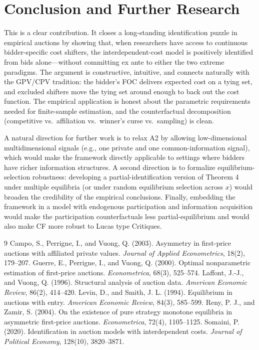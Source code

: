 \documentclass{article}
\begin{document}
\section{Conclusion and Further Research}
\label{section4}
This is a clear contribution. It closes a long-standing identification puzzle in empirical auctions by showing that, when researchers have access to continuous bidder-specific cost shifters, the interdependent-cost model is positively identified from bids alone---without committing ex ante to either the two extreme paradigms. The argument is constructive, intuitive, and connects naturally with the GPV/CPV tradition: the bidder's FOC delivers expected cost on a tying set, and excluded shifters move the tying set around enough to back out the cost function. The empirical application is honest about the parametric requirements needed for finite-sample estimation, and the counterfactual decomposition (competitive vs.\ affiliation vs.\ winner's curse vs.\ sampling) is clean.

A natural direction for further work is to relax A2 by allowing low-dimensional multidimensional signals (e.g., one private and one common-information signal), which would make the framework directly applicable to settings where bidders have richer information structures. A second direction is to formalize equilibrium-selection robustness: developing a partial-identification version of Theorem 4 under multiple equilibria (or under random equilibrium selection across $x$) would broaden the credibility of the empirical conclusions. Finally, embedding the framework in a model with endogenous participation and information acquisition would make the participation counterfactuals less partial-equilibrium and would also make CF more robust to Lucas type Critiques.


\begin{thebibliography}{9}
 Campo, S., Perrigne, I., and Vuong, Q. (2003). Asymmetry in first-price auctions with affiliated private values. \emph{Journal of Applied Econometrics}, 18(2), 179--207.
 Guerre, E., Perrigne, I., and Vuong, Q. (2000). Optimal nonparametric estimation of first-price auctions. \emph{Econometrica}, 68(3), 525--574.
 Laffont, J.-J., and Vuong, Q. (1996). Structural analysis of auction data. \emph{American Economic Review}, 86(2), 414--420.
 Levin, D., and Smith, J. L. (1994). Equilibrium in auctions with entry. \emph{American Economic Review}, 84(3), 585--599.
 Reny, P. J., and Zamir, S. (2004). On the existence of pure strategy monotone equilibria in asymmetric first-price auctions. \emph{Econometrica}, 72(4), 1105--1125.
 Somaini, P. (2020). Identification in auction models with interdependent costs. \emph{Journal of Political Economy}, 128(10), 3820--3871.
\end{thebibliography}
\end{document}
